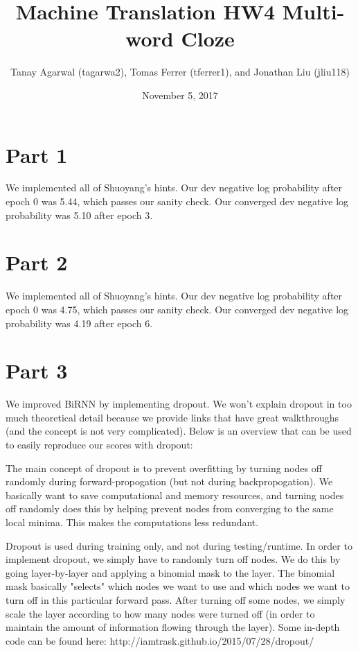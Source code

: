 \documentclass{article}
\title{Machine Translation HW4 Multi-word Cloze}
\author{Tanay Agarwal (tagarwa2), Tomas Ferrer (tferrer1), and Jonathan Liu (jliu118)}
\date{November 5, 2017}
\begin{document}
\maketitle


\section{Part 1}

We implemented all of Shuoyang's hints. Our dev negative log probability after epoch 0 was 5.44, which passes our sanity check. Our converged dev negative log probability was 5.10 after epoch 3.

\section{Part 2}

We implemented all of Shuoyang's hints. Our dev negative log probability after epoch 0 was 4.75, which passes our sanity check. Our converged dev negative log probability was 4.19 after epoch 6.

\section{Part 3}

We improved BiRNN by implementing dropout. We won't explain dropout in too much theoretical detail because we provide links that have great walkthroughs (and the concept is not very complicated). Below is an overview that can be used to easily reproduce our scores with dropout:

The main concept of dropout is to prevent overfitting by turning nodes off randomly during forward-propogation (but not during backpropogation). We basically want to save computational and memory resources, and turning nodes off randomly does this by helping prevent nodes from converging to the same local minima. This makes the computations less redundant.

Dropout is used during training only, and not during testing/runtime. In order to implement dropout, we simply have to randomly turn off nodes. We do this by going layer-by-layer and applying a binomial mask to the layer. The binomial mask basically "selects" which nodes we want to use and which nodes we want to turn off in this particular forward pass. After turning off some nodes, we simply scale the layer according to how many nodes were turned off (in order to maintain the amount of information flowing through the layer). Some in-depth code can be found here: http://iamtrask.github.io/2015/07/28/dropout/
\end{document}
